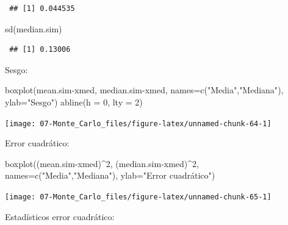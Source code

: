 \documentclass[
  10pt,
]{book}
\newenvironment{Shaded}{\begin{snugshade}}{\end{snugshade}}
\newcommand{\AttributeTok}[1]{\textcolor[rgb]{0.77,0.63,0.00}{#1}}
\newcommand{\DecValTok}[1]{\textcolor[rgb]{0.00,0.00,0.81}{#1}}
\newcommand{\FunctionTok}[1]{\textcolor[rgb]{0.00,0.00,0.00}{#1}}
\newcommand{\NormalTok}[1]{#1}
\newcommand{\SpecialCharTok}[1]{\textcolor[rgb]{0.00,0.00,0.00}{#1}}
\newcommand{\StringTok}[1]{\textcolor[rgb]{0.31,0.60,0.02}{#1}}
\theoremstyle{break}
\theoremstyle{nonumberplain}
\begin{document}
\begin{enumerate}
\begin{verbatim}
 ## [1] 0.044535
\end{verbatim}

\begin{Shaded}
\begin{Highlighting}[]
\FunctionTok{sd}\NormalTok{(median.sim)}
\end{Highlighting}
\end{Shaded}

\begin{verbatim}
 ## [1] 0.13006
\end{verbatim}

  Sesgo:

\begin{Shaded}
\begin{Highlighting}[]
\FunctionTok{boxplot}\NormalTok{(mean.sim}\SpecialCharTok{{-}}\NormalTok{xmed, median.sim}\SpecialCharTok{{-}}\NormalTok{xmed, }
      \AttributeTok{names=}\FunctionTok{c}\NormalTok{(}\StringTok{"Media"}\NormalTok{,}\StringTok{"Mediana"}\NormalTok{), }\AttributeTok{ylab=}\StringTok{"Sesgo"}\NormalTok{)}
\FunctionTok{abline}\NormalTok{(}\AttributeTok{h =} \DecValTok{0}\NormalTok{, }\AttributeTok{lty =} \DecValTok{2}\NormalTok{)}
\end{Highlighting}
\end{Shaded}

  \begin{center}\texttt{[image: 07-Monte\_Carlo\_files/figure-latex/unnamed-chunk-64-1]} \end{center}

  Error cuadrático:

\begin{Shaded}
\begin{Highlighting}[]
\FunctionTok{boxplot}\NormalTok{((mean.sim}\SpecialCharTok{{-}}\NormalTok{xmed)}\SpecialCharTok{\^{}}\DecValTok{2}\NormalTok{, (median.sim}\SpecialCharTok{{-}}\NormalTok{xmed)}\SpecialCharTok{\^{}}\DecValTok{2}\NormalTok{, }
      \AttributeTok{names=}\FunctionTok{c}\NormalTok{(}\StringTok{"Media"}\NormalTok{,}\StringTok{"Mediana"}\NormalTok{), }\AttributeTok{ylab=}\StringTok{"Error cuadrático"}\NormalTok{)}
\end{Highlighting}
\end{Shaded}

  \begin{center}\texttt{[image: 07-Monte\_Carlo\_files/figure-latex/unnamed-chunk-65-1]} \end{center}

  Estadísticos error cuadrático:


\end{enumerate}
\end{document}

